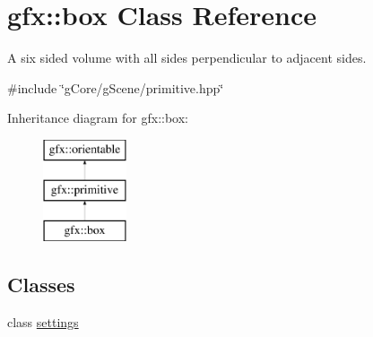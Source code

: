 \hypertarget{classgfx_1_1box}{\section{gfx\-:\-:box Class Reference}
\label{classgfx_1_1box}
}


A six sided volume with all sides perpendicular to adjacent sides.  




{\ttfamily \#include \char`\"{}g\-Core/g\-Scene/primitive.\-hpp\char`\"{}}

Inheritance diagram for gfx\-:\-:box\-:\begin{figure}[H]
\begin{center}
\leavevmode
\includegraphics[height=3.000000cm]{classgfx_1_1box}
\end{center}
\end{figure}
\subsection*{Classes}
\begin{DoxyCompactItemize}
\item 
class \hyperlink{classgfx_1_1box_1_1settings}{settings}
\end{DoxyCompactItemize}

